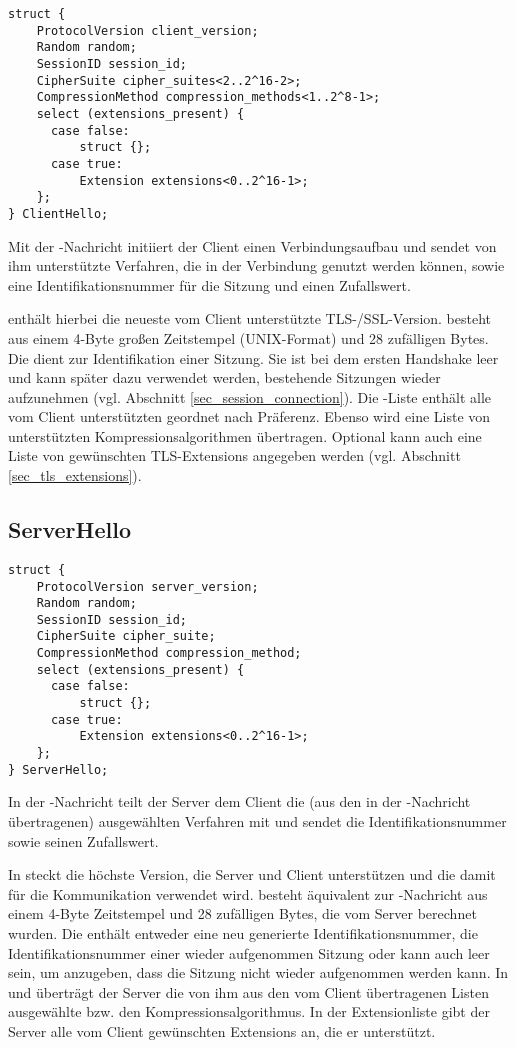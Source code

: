 \begin{lstlisting}
struct {
	ProtocolVersion client_version;
	Random random;
	SessionID session_id;
	CipherSuite cipher_suites<2..2^16-2>;
	CompressionMethod compression_methods<1..2^8-1>;
	select (extensions_present) {
	  case false:
	      struct {};
	  case true:
	      Extension extensions<0..2^16-1>;
	};
} ClientHello;
\end{lstlisting}

Mit der \clienthello{}-Nachricht initiiert der Client einen Verbindungsaufbau und sendet von ihm unterstützte Verfahren, die in der Verbindung genutzt werden können, sowie eine Identifikationsnummer für die Sitzung und einen Zufallswert.

 enthält hierbei die neueste vom Client unterstützte TLS-/SSL-Version. 
 besteht aus einem 4-Byte großen Zeitstempel (UNIX-Format) und 28 zufälligen Bytes. 
Die  dient zur Identifikation einer Sitzung. Sie ist bei dem ersten Handshake leer und kann später dazu verwendet werden, bestehende Sitzungen wieder aufzunehmen (vgl. Abschnitt \ref{sec_session_connection}). 
Die \ciphersuite{}-Liste enthält alle vom Client unterstützten \ciphersuites{} geordnet nach Präferenz. 
Ebenso wird eine Liste von unterstützten Kompressionsalgorithmen übertragen. 
Optional kann auch eine Liste von gewünschten TLS-Extensions angegeben werden (vgl. Abschnitt \ref{sec_tls_extensions}).

\subsection{ServerHello}
\label{sec_handshake_server_hello}

\begin{lstlisting}
struct {
	ProtocolVersion server_version;
	Random random;
	SessionID session_id;
	CipherSuite cipher_suite;
	CompressionMethod compression_method;
	select (extensions_present) {
	  case false:
	      struct {};
	  case true:
	      Extension extensions<0..2^16-1>;
	};
} ServerHello;
\end{lstlisting}

In der \serverhello{}-Nachricht teilt der Server dem Client die (aus den in der \clienthello{}-Nachricht übertragenen) ausgewählten Verfahren mit und sendet die Identifikationsnummer sowie seinen Zufallswert.

In  steckt die höchste Version, die Server und Client unterstützen und die damit für die Kommunikation verwendet wird.  besteht äquivalent zur \clienthello{}-Nachricht aus einem 4-Byte Zeitstempel und 28 zufälligen Bytes, die vom Server berechnet wurden. Die  enthält entweder eine neu generierte Identifikationsnummer, die Identifikationsnummer einer wieder aufgenommen Sitzung oder kann auch leer sein, um anzugeben, dass die Sitzung nicht wieder aufgenommen werden kann. In  und  überträgt der Server die von ihm aus den vom Client übertragenen Listen ausgewählte \ciphersuite{} bzw. den Kompressionsalgorithmus. In der Extensionliste gibt der Server alle vom Client gewünschten Extensions an, die er unterstützt.

